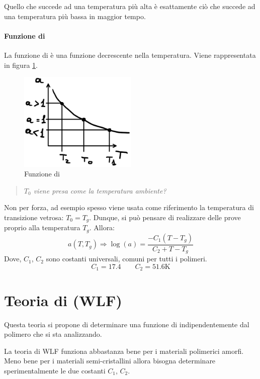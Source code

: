 Quello che succede ad una temperatura più alta è esattamente ciò che succede ad una temperatura più bassa in maggior tempo.

\paragraph{Funzione di }
La funzione di  è una funzione decrescente nella temperatura.
Viene rappresentata in figura \ref{fig:Shift}.
\begin{figure}
\centering
\includegraphics[width = 0.5\textwidth]{gfx/Shift}
\caption{Funzione di }
\label{fig:Shift}
\end{figure}

\begin{quote}
\emph{$T_0$ viene presa come la temperatura ambiente?}
\end{quote}
Non per forza, ad esempio spesso viene usata come riferimento la temperatura di transizione vetrosa: $T_0=T_g$.
Dunque, si può pensare di realizzare delle prove proprio alla temperatura $T_g$.
Allora:
\begin{equation}
a(T,T_g) \Rightarrow \log(a) = \frac{-C_1(T-T_g)}{C_2 + T -T_g}
\end{equation}
Dove, $C_1$, $C_2$ sono costanti universali, comuni per tutti i polimeri.
\begin{equation}
C_1 = 17.4 \qquad C_2 = 51.6\unit{\kelvin}
\end{equation}

\section{Teoria di  (WLF)}
Questa teoria si propone di determinare una funzione di  indipendentemente dal polimero che si sta analizzando.

La teoria di \ac{WLF} funziona abbastanza bene per i materiali polimerici amorfi. 
Meno bene per i materiali semi-cristallini allora bisogna determinare sperimentalmente le due costanti $C_1$, $C_2$.

